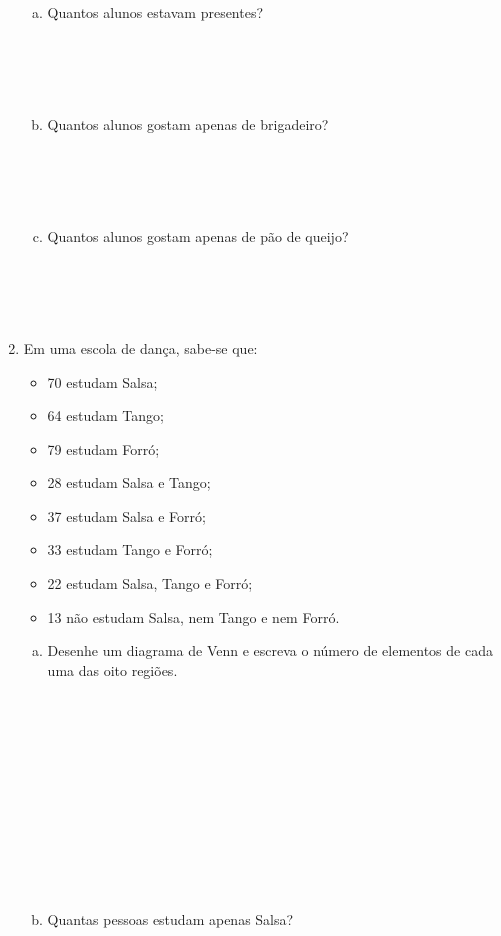 \documentclass[a4paper,14pt]{article}
\begin{document}
\begin{multicols}{2}
\begin{enumerate}
    	\begin{enumerate}[a)]
    		\item Quantos alunos estavam presentes? \\\\\\\\\\
    		\item Quantos alunos gostam apenas de brigadeiro? \\\\\\\\\\
    		\item Quantos alunos gostam apenas de pão de queijo? \\\\\\\\\\
    	\end{enumerate}
    	\item Em uma escola de dança, sabe-se que:
    	\begin{itemize}
    		\item 70 estudam Salsa;
    		\item 64 estudam Tango;
    		\item 79 estudam Forró;
    		\item 28 estudam Salsa e Tango;
    		\item 37 estudam Salsa e Forró;
    		\item 33 estudam Tango e Forró;
    		\item 22 estudam Salsa, Tango e Forró;
    		\item 13 não estudam Salsa, nem Tango e nem Forró.
    	\end{itemize}
    	\begin{enumerate}[a)]
    		\item Desenhe um diagrama de Venn e escreva o número de elementos de cada uma das oito regiões. \\\\\\\\\\\\\\\\\\\\\\\\
    		\item Quantas pessoas estudam apenas Salsa? \\\\\\\\\\

\end{enumerate}
\end{enumerate}
\end{multicols}
\end{document}
